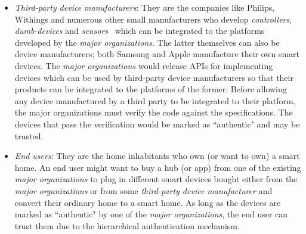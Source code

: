 \documentclass{article}
\begin{document}
\begin{itemize}[topsep=0pt,itemsep=0ex,partopsep=1ex,parsep=1ex]
\item \textit{Third-party device manufacturers}: They are the companies like Philips, Withings and numerous other small manufacturers who develop \textit{controllers}, \textit{dumb-devices} and \textit{sensors}~\cite{workswithsmartthings, workswithhomekit} which can be integrated to the platforms developed by the \textit{major organizations}. The latter themselves can also be device manufacturers; both Samsung and Apple manufacture their own smart devices. 
The \textit{major organizations} would release APIs for implementing devices which can be used by third-party device manufacturers so that their products can be integrated to the platforms of the former.
Before  allowing any device manufactured by a third party to be integrated to their platform, the major organizations must verify the code against the specifications. The devices that pass the verification would be marked as ``authentic" and may be trusted. 

\item \textit{End users}: They are the home inhabitants who own (or want to own) a smart home. An end user might want to buy a hub (or app) from one of the existing \textit{major organizations} to plug in different smart devices bought either from the \textit{major organizations} or from some \textit{third-party device manufacturer} and convert their ordinary home to a smart home. As long as the devices are marked as ``authentic" by one of the \textit{major organizations}, the end user can trust them due to the hierarchical authentication mechanism.
\end{itemize}



\end{document}
